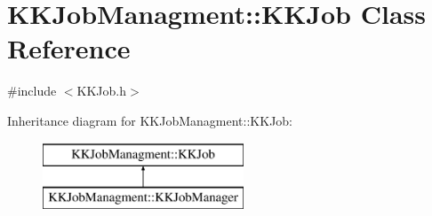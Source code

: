 \hypertarget{class_k_k_job_managment_1_1_k_k_job}{}\section{K\+K\+Job\+Managment\+:\+:K\+K\+Job Class Reference}
\label{class_k_k_job_managment_1_1_k_k_job}


{\ttfamily \#include $<$K\+K\+Job.\+h$>$}

Inheritance diagram for K\+K\+Job\+Managment\+:\+:K\+K\+Job\+:\begin{figure}[H]
\begin{center}
\leavevmode
\includegraphics[height=2.000000cm]{class_k_k_job_managment_1_1_k_k_job}
\end{center}
\end{figure}
